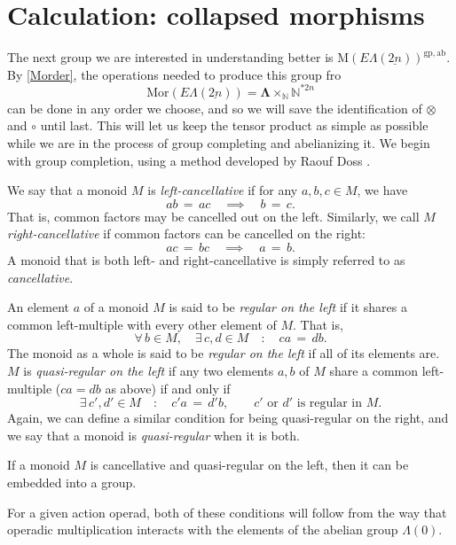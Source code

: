 \documentclass{amsbook} %
\newcommand{\ML}{\mathbf{\Lambda}}
\newcommand{\ELnn}{E\Lambda(\underline{2n})}
\numberwithin{section}{chapter}
\begin{document}
\section{Calculation: collapsed morphisms}

The next group we are interested in understanding better is $\mathrm{M}(\ELnn)^{\mathrm{gp},\mathrm{ab}}$. By \cref{Morder}, the operations needed to produce this group fro
\[
\mathrm{Mor}(\ELnn) = \ML \times_{\mathbb{N}} \mathbb{N}^{\ast 2n}
\]
can be done in any order we choose, and so we will save the identification of $\otimes$ and $\circ$ until last. This will let us keep the tensor product as simple as possible while we are in the process of group completing and abelianizing it. We begin with group completion, using a method developed by Raouf Doss \cite{doss-imm}.

\begin{Defi} We say that a monoid $M$ is \emph{left-cancellative} if for any $a, b, c \in M$, we have
\[ ab \, = \, ac \quad \implies \quad b \, = \, c. \]
That is, common factors may be cancelled out on the left. Similarly, we call $M$ \emph{right-cancellative} if common factors can be cancelled on the right:
\[ ac \, = \, bc \quad \implies \quad a \, = \, b. \]
A monoid that is both left- and right-cancellative is simply referred to as \emph{cancellative}.
\end{Defi}

\begin{Defi} An element $a$ of a monoid $M$ is said to be \emph{regular on the left} if it shares a common left-multiple with every other element of $M$. That is,
\[ \forall \, b \in M, \quad \exists \, c, d \in M \quad : \quad ca \, = \, db. \]
The monoid as a whole is said to be \emph{regular on the left} if all of its elements are.
 $M$ is \emph{quasi-regular on the left} if any two elements $a,b$ of $M$ share a common left-multiple ($ca = db$ as above) if and only if
\[ \exists \, c', d' \in M \quad : \quad c'a \, = \, d'b, \quad \quad \text{$c'$ or $d'$ is regular in $M$.} \]
Again, we can define a similar condition for being quasi-regular on the right, and we say that a monoid is \emph{quasi-regular} when it is both.
\end{Defi}

\begin{prop} If a monoid $M$ is cancellative and quasi-regular on the left, then it can be embedded into a group.
\end{prop}

For a given action operad, both of these conditions will follow from the way that operadic multiplication interacts with the elements of the abelian group $\Lambda(0)$.
\end{document}
